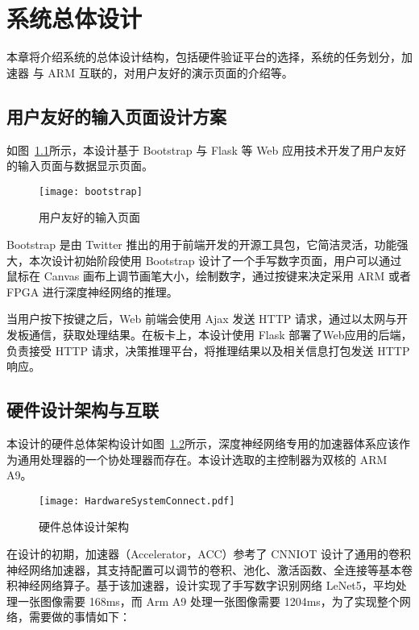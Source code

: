 \chapter{系统总体设计}\label{chap:systemoveral}

本章将介绍系统的总体设计结构，包括硬件验证平台的选择，系统的任务划分，加速器 与 ARM 互联的，对用户友好的演示页面的介绍等。

\section{用户友好的输入页面设计方案}

如图~\ref{fig:BootStrap}所示，本设计基于 Bootstrap 与 Flask 等 Web 应用技术开发了用户友好的输入页面与数据显示页面。

\begin{figure}[!htbp]
    \centering
    \texttt{[image: bootstrap]}
    \caption{用户友好的输入页面}
    \label{fig:BootStrap}
\end{figure}

Bootstrap 是由 Twitter 推出的用于前端开发的开源工具包，它简洁灵活，功能强大，本次设计初始阶段使用 Bootstrap 设计了一个手写数字页面，用户可以通过鼠标在 Canvas 画布上调节画笔大小，绘制数字，通过按键来决定采用 ARM 或者 FPGA 进行深度神经网络的推理。

当用户按下按键之后，Web 前端会使用 Ajax 发送 HTTP 请求，通过以太网与开发板通信，获取处理结果。在板卡上，本设计使用 Flask 部署了Web应用的后端，负责接受 HTTP 请求，决策推理平台，将推理结果以及相关信息打包发送 HTTP 响应。

\section{硬件设计架构与互联}

本设计的硬件总体架构设计如图~\ref{fig:Hardware System Connect}所示，深度神经网络专用的加速器体系应该作为通用处理器的一个协处理器而存在。本设计选取的主控制器为双核的 ARM A9。

\begin{figure}[!htbp]
    \centering
    \texttt{[image: HardwareSystemConnect.pdf]}
    \caption{硬件总体设计架构}
    \label{fig:Hardware System Connect}
\end{figure}

在设计的初期，加速器（Accelerator，ACC）参考了 CNNIOT 设计了通用的卷积神经网络加速器，其支持配置可以调节的卷积、池化、激活函数、全连接等基本卷积神经网络算子。基于该加速器，设计实现了手写数字识别网络 LeNet5，平均处理一张图像需要 168ms，而 Arm A9 处理一张图像需要 1204ms，为了实现整个网络，需要做的事情如下：

